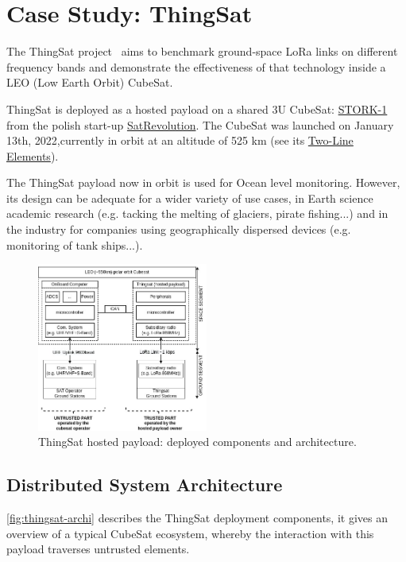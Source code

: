 \section{Case Study: ThingSat}
\label{sec:case-study}

The ThingSat project~\cite{git:thingsat-repo} aims to benchmark ground-space
LoRa links on different frequency bands and demonstrate the
effectiveness of that technology inside a LEO (Low Earth Orbit) CubeSat.

ThingSat is deployed as a hosted payload on a shared 3U CubeSat:
\href{https://space.skyrocket.de/doc_sdat/stork-1.htm}{STORK-1} from the polish
start-up \href{https://www.satrevolution.com/}{SatRevolution}. The CubeSat was
launched on January 13th, 2022,currently in orbit at an altitude of 525 km (see its
\href{https://www.n2yo.com/database/?q=STORK-1\#results}{Two-Line Elements}).

The ThingSat payload now in orbit is used for Ocean level monitoring. However,
its design can be adequate for a wider variety of use cases, in Earth science
academic research (e.g. tacking the  melting of glaciers, pirate fishing...)
and in the industry for companies using geographically dispersed devices (e.g.
monitoring of tank ships...).

\begin{figure}[t]
    \includegraphics[width=0.5\textwidth]{Figures/globecom-thingsat-mods.jpg}
    \caption{ThingSat hosted payload: deployed components and architecture.}
    \label{fig:thingsat-archi}
\end{figure}

\subsection{Distributed System Architecture}

\autoref{fig:thingsat-archi} describes the ThingSat deployment components, it gives an
overview of a typical CubeSat ecosystem, whereby the interaction with this payload
traverses untrusted elements.

